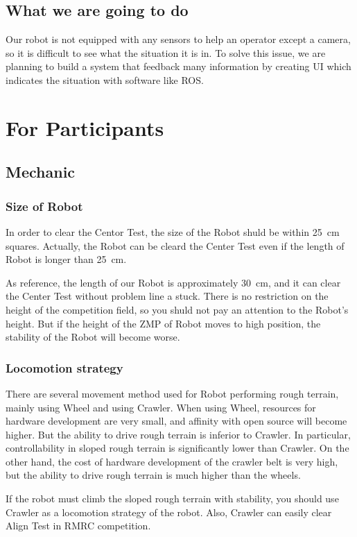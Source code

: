 \documentclass[journal]{IEEEtran}
\begin{document}
\subsection{What we are going to do}
Our robot is not equipped with any sensors to help an operator except a camera, so it is difficult to see what the situation it is in.
To solve this issue, we are planning to build a system that feedback many information by creating UI which indicates the situation with software like ROS.

\section{For Participants}
\subsection{Mechanic}
\subsubsection{Size of Robot}
In order to clear the Centor Test, the size of the Robot shuld be within \SI{25}{\cm} squares.
Actually, the Robot can be cleard the Center Test even if the length of Robot is longer than \SI{25}{\cm}.

As reference, the length of our Robot is approximately \SI{30}{\cm}, and it can clear the Center Test without problem line a stuck.
There is no restriction on the height of the competition field, so you shuld not pay an attention to the Robot's height. But if the height of the ZMP of Robot moves to high position, the stability of the Robot will become worse.

\subsubsection{Locomotion strategy}
There are several movement method used for Robot performing rough terrain, mainly using Wheel and using Crawler.
When using Wheel, resources for hardware development are very small, and affinity with open source will become higher.
But the ability to drive rough terrain is inferior to Crawler.
In particular, controllability in sloped rough terrain is significantly lower than Crawler.
On the other hand, the cost of hardware development of the crawler belt is very high, but the ability to drive rough terrain is much higher than the wheels.

If the robot must climb the sloped rough terrain with stability, you should use Crawler as a locomotion strategy of the robot.
Also, Crawler can easily clear Align Test in RMRC competition.
\end{document}
